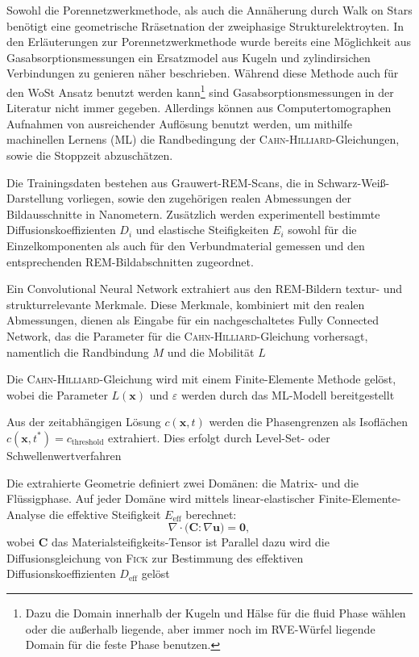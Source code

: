 Sowohl die Porennetzwerkmethode, als auch die Annäherung durch Walk on Stars benötigt eine geometrische Rräsetnation der zweiphasige Strukturelektroyten. In den Erläuterungen zur Porennetzwerkmethode wurde bereits eine Möglichkeit aus Gasabsorptionsmessungen ein Ersatzmodel aus Kugeln und zylindirsichen Verbindungen zu genieren näher beschrieben. Während diese Methode auch für den WoSt Ansatz benutzt werden kann\footnote{Dazu die Domain innerhalb der Kugeln und Hälse für die fluid Phase wählen oder die außerhalb liegende, aber immer noch im RVE-Würfel liegende Domain für die feste Phase benutzen.} sind Gasabsorptionsmessungen in der Literatur nicht immer gegeben. Allerdings können aus Computertomographen Aufnahmen von ausreichender Auflösung benutzt werden, um mithilfe machinellen Lernens (ML) die Randbedingung der \textsc{Cahn-Hilliard}-Gleichungen, sowie die Stoppzeit abzuschätzen.

Die Trainingsdaten bestehen aus Grauwert-REM-Scans, die in Schwarz-Weiß-Darstellung vorliegen, sowie den zugehörigen realen Abmessungen der Bildausschnitte in Nanometern. Zusätzlich werden experimentell bestimmte Diffusionskoeffizienten $D_i$ und elastische Steifigkeiten $E_i$ sowohl für die Einzelkomponenten als auch für den Verbundmaterial gemessen und den entsprechenden REM-Bildabschnitten zugeordnet.

Ein Convolutional Neural Network extrahiert aus den REM-Bildern textur- und strukturrelevante Merkmale. Diese Merkmale, kombiniert mit den realen Abmessungen, dienen als Eingabe für ein nachgeschaltetes Fully Connected Network, das die Parameter für die \textsc{Cahn-Hilliard}-Gleichung vorhersagt, namentlich die Randbindung $M$ und die Mobilität $L$ %

Die \textsc{Cahn-Hilliard}-Gleichung wird mit einem Finite-Elemente Methode gelöst, wobei die Parameter $L(\mathbf{x})$ und $\varepsilon$ werden durch das ML-Modell bereitgestellt %

Aus der zeitabhängigen Lösung $c(\mathbf{x},t)$ werden die Phasengrenzen als Isoflächen $c(\mathbf{x},t^*) = c_\mathrm{threshold}$ extrahiert. Dies erfolgt durch Level-Set- oder Schwellenwertverfahren %

Die extrahierte Geometrie definiert zwei Domänen: die Matrix- und die Flüssigphase. Auf jeder Domäne wird mittels linear-elastischer Finite-Elemente-Analyse die effektive Steifigkeit $E_\mathrm{eff}$ berechnet:
\begin{equation}
\nabla \cdot \bigl(\mathbf{C} : \nabla \mathbf{u}\bigr) = \mathbf{0}, 
\end{equation}
wobei $\mathbf{C}$ das Materialsteifigkeits-Tensor ist %
Parallel dazu wird die Diffusionsgleichung von \textsc{Fick}
zur Bestimmung des effektiven Diffusionskoeffizienten $D_\mathrm{eff}$ gelöst %

